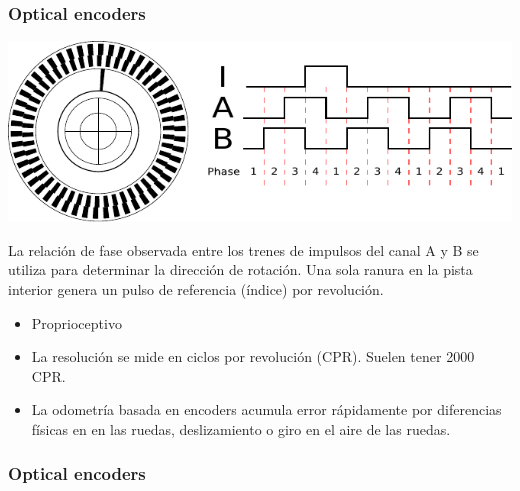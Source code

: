 \begin{frame}
    \frametitle{Optical encoders}

    \includegraphics[width=\columnwidth]{images/encoder.pdf}
    \footnotesize

    La relación de fase observada entre los trenes de impulsos del canal A y B se utiliza para determinar la dirección de rotación. Una sola ranura en la pista interior genera un pulso de referencia (índice) por revolución.

    \begin{itemize}
        \item Proprioceptivo
        \item La resolución se mide en ciclos por revolución (CPR). Suelen tener 2000 CPR.
        \item La odometría basada en encoders acumula error rápidamente por diferencias físicas en en las ruedas, deslizamiento o giro en el aire de las ruedas.
    \end{itemize}
\end{frame}

\begin{frame}
    \frametitle{Optical encoders}
    
    \begin{figure}[!h]
        \centering
        \\
    \end{figure}
    

\end{frame}

